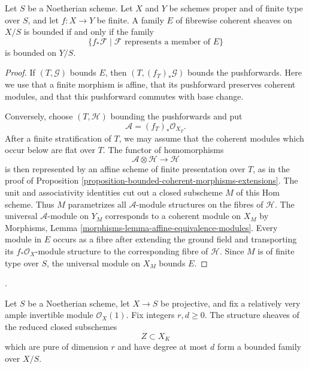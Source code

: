 \begin{lemma}
\label{lemma-bounded-finite-pushforward}
Let $S$ be a Noetherian scheme. Let $X$ and $Y$ be schemes proper and of
finite type over $S$, and let $f:X\to Y$ be finite. A family $E$ of fibrewise
coherent sheaves on $X/S$ is bounded if and only if the family
$$
\{f_*\mathcal{F}\mid\mathcal{F}\text{ represents a member of }E\}
$$
is bounded on $Y/S$.
\end{lemma}

\begin{proof}
If $(T,\mathcal{G})$ bounds $E$, then
$(T,(f_T)_*\mathcal{G})$ bounds the pushforwards. Here we use that a finite
morphism is affine, that its pushforward preserves coherent modules, and that
this pushforward commutes with base change.

Conversely, choose $(T,\mathcal{H})$ bounding the pushforwards and put
$$
\mathcal{A}=(f_T)_*\mathcal{O}_{X_T}.
$$
After a finite stratification of $T$, we may assume that the coherent modules
which occur below are flat over $T$. The functor of homomorphisms
$$
\mathcal{A}\otimes\mathcal{H}\longrightarrow\mathcal{H}
$$
is then represented by an affine scheme of finite presentation over $T$, as
in the proof of Proposition
\ref{proposition-bounded-coherent-morphisms-extensions}. The unit and
associativity identities cut out a closed subscheme $M$ of this Hom scheme.
Thus $M$ parametrizes all $\mathcal{A}$-module structures on the fibres of
$\mathcal{H}$. The universal $\mathcal{A}$-module on $Y_M$ corresponds to a
coherent module on $X_M$ by Morphisms, Lemma
\ref{morphisms-lemma-affine-equivalence-modules}. Every module in $E$ occurs
as a fibre after extending the ground field and transporting its
$f_*\mathcal{O}_X$-module structure to the corresponding fibre of
$\mathcal{H}$. Since $M$ is of finite type over $S$, the universal module on
$X_M$ bounds $E$.
\end{proof}

\begin{lemma}
\label{lemma-bounded-reduced-equidimensional-degree}
\begin{reference}
\cite[Expos\'e 221, Lemma 2.4, p. 255]{FGA}.
\end{reference}
Let $S$ be a Noetherian scheme, let $X\to S$ be projective, and fix a
relatively very ample invertible module $\mathcal{O}_X(1)$. Fix integers
$r,d\geq0$. The structure sheaves of the reduced closed subschemes
$$
Z\subset X_K
$$
which are pure of dimension $r$ and have degree at most $d$ form a bounded
family over $X/S$.
\end{lemma}


